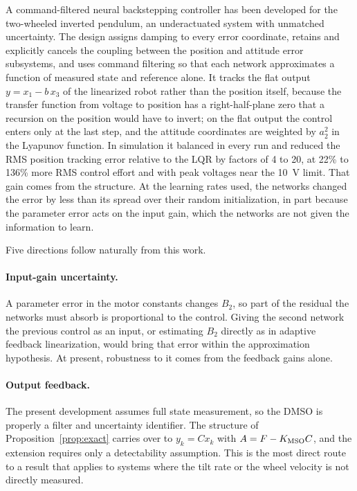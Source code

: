 A command-filtered neural backstepping controller has been developed for
the two-wheeled inverted pendulum, an underactuated system with unmatched
uncertainty. The design assigns damping to every error coordinate, retains and
explicitly cancels the coupling between the position and attitude error
subsystems, and uses command filtering so that each network approximates a
function of measured state and reference alone. It tracks the flat output
$y=x_1-b\,x_3$ of the linearized robot rather than the position itself, because
the transfer function from voltage to position has a right-half-plane zero that
a recursion on the position would have to invert; on the flat output the
control enters only at the last step, and the attitude coordinates are weighted
by $a_2^2$ in the Lyapunov function. In simulation it balanced in every run and
reduced the RMS position tracking error relative to the LQR by factors of 4 to
20, at 22\% to 136\% more RMS control effort and with peak voltages near the
\SI{10}{V} limit. That gain comes from the structure. At the learning rates
used, the networks changed the error by less than its spread over their random
initialization, in part because the parameter error acts on the input gain,
which the networks are not given the information to learn.

Five directions follow naturally from this work.

\paragraph{Input-gain uncertainty.} A parameter error in the motor
constants changes $B_2$, so part of the residual the networks must absorb is
proportional to the control. Giving the second network the previous control as
an input, or estimating $B_2$ directly as in adaptive feedback linearization,
would bring that error within the approximation hypothesis. At present,
robustness to it comes from the feedback gains alone.

\paragraph{Output feedback.} The present development assumes full state
measurement, so the DMSO is properly a filter and uncertainty identifier. The
structure of Proposition~\ref{prop:exact} carries over to $y_k=Cx_k$ with
$A=F-K_{\mathrm{MSO}} C$, and the extension requires only a detectability assumption. This
is the most direct route to a result that applies to systems where the tilt rate
or the wheel velocity is not directly measured.

